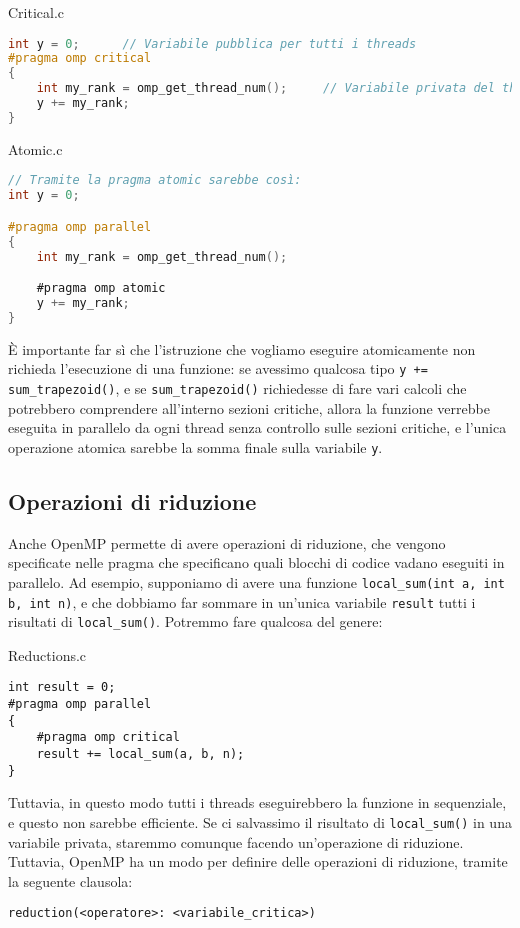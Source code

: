 \begin{codeblock}{Critical.c}
    \begin{lstlisting}[language = C]
int y = 0;      // Variabile pubblica per tutti i threads
#pragma omp critical
{   
    int my_rank = omp_get_thread_num();     // Variabile privata del thread
    y += my_rank;
}\end{lstlisting}
\end{codeblock}
\pagebreak
\begin{codeblock}{Atomic.c}
    \begin{lstlisting}[language = C]
// Tramite la pragma atomic sarebbe così:
int y = 0;

#pragma omp parallel
{
    int my_rank = omp_get_thread_num();

    #pragma omp atomic
    y += my_rank;
}\end{lstlisting}
\end{codeblock}

È importante far sì che l'istruzione che vogliamo eseguire atomicamente non richieda l'esecuzione di una funzione: se avessimo qualcosa tipo \verb|y += sum_trapezoid()|, e se \verb|sum_trapezoid()| richiedesse di fare vari calcoli che potrebbero comprendere all'interno sezioni critiche, allora la funzione verrebbe eseguita in parallelo da ogni thread senza controllo sulle sezioni critiche, e l'unica operazione atomica sarebbe la somma finale sulla variabile \verb|y|.

\subsection{Operazioni di riduzione}

Anche OpenMP permette di avere operazioni di riduzione, che vengono specificate nelle pragma che specificano quali blocchi di codice vadano eseguiti in parallelo. Ad esempio, supponiamo di avere una funzione \verb|local_sum(int a, int b, int n)|, e che dobbiamo far sommare in un'unica variabile \verb|result| tutti i risultati di \verb|local_sum()|. Potremmo fare qualcosa del genere:

\begin{codeblock}{Reductions.c}
    \begin{lstlisting}[langauge = c]
int result = 0;
#pragma omp parallel
{
    #pragma omp critical
    result += local_sum(a, b, n);
}\end{lstlisting}
\end{codeblock}

Tuttavia, in questo modo tutti i threads eseguirebbero la funzione in sequenziale, e questo non sarebbe efficiente. Se ci salvassimo il risultato di \verb|local_sum()| in una variabile privata, staremmo comunque facendo un'operazione di riduzione. Tuttavia, OpenMP ha un modo per definire delle operazioni di riduzione, tramite la seguente clausola:
\begin{center}
    \verb|reduction(<operatore>: <variabile_critica>)|
\end{center}

